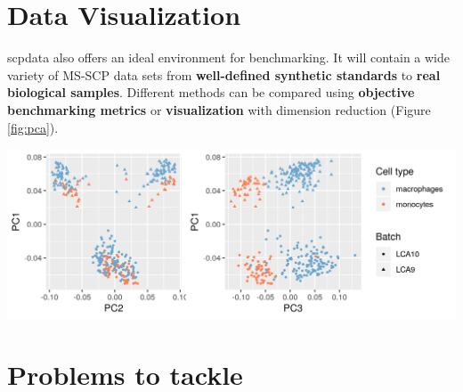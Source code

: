 \documentclass{article}
\title{}
\author{}
\date{}
\newcommand{\hcode}[2][lgray]{{\ttfamily\color{vdgray}\colorbox{#1}{#2}}}
\begin{document}
\noindent
\begin{minipage}[t]{\linewidth}
  \vspace{0.5cm}
  \section*{\huge Data Visualization}
  \large
  \hcode{scpdata} also offers an ideal environment for benchmarking. It will contain a wide variety of MS-SCP data sets from \textbf{well-defined synthetic standards} to \textbf{real biological samples}. Different methods can be compared using \textbf{objective benchmarking metrics} or \textbf{visualization} with dimension reduction (Figure \ref{fig:pca}).
  \begin{center}
    \includegraphics[width=\textwidth]{figs/PCA.png}
  \end{center}
  \label{fig:pca}

\end{minipage}

\noindent
\begin{minipage}[t]{\linewidth}
  \vspace{0.35cm}
  \section*{\huge Problems to tackle}
  \vspace{0.15cm}
\end{minipage}
  
\end{document}
